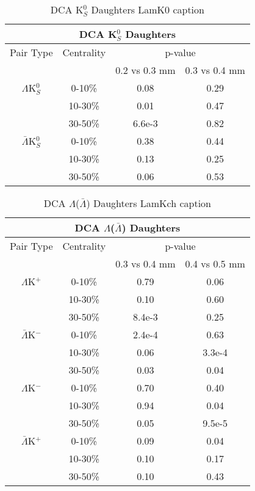 \begin{table}
 \centering
 \begin{tabular}{|c|c|c|c|}
 \multicolumn{4}{c}{DCA K$^{0}_{S}$ Daughters} \\
  \hline
  Pair Type & Centrality & \multicolumn{2}{c|}{p-value} \\
  \cline{3-4}
   & & 0.2 vs 0.3 mm & 0.3 vs 0.4 mm \\
  \hline
  $\Lambda$K$^{0}_{S}$ & 0-10\% & 0.08 & 0.29 \\
   & 10-30\% & 0.01 & 0.47 \\
   & 30-50\% & 6.6e-3 & 0.82 \\
  \hline
  $\bar{\Lambda}$K$^{0}_{S}$ & 0-10\% & 0.38 & 0.44 \\
   & 10-30\% & 0.13 & 0.25 \\
   & 30-50\% & 0.06 & 0.53 \\
  \hline
 \end{tabular}
 \caption{DCA K$^{0}_{S}$ Daughters LamK0 caption}
 \label{tab:K0DaughtersDcaLamK0}
\end{table}

\begin{table}
 \centering
 \begin{tabular}{|c|c|c|c|}
 \multicolumn{4}{c}{DCA $\Lambda$($\bar{\Lambda}$) Daughters} \\
  \hline
  Pair Type & Centrality & \multicolumn{2}{c|}{p-value} \\
  \cline{3-4}
   & & 0.3 vs 0.4 mm & 0.4 vs 0.5 mm \\
  \hline
  $\Lambda$K$^{+}$ & 0-10\% & 0.79 & 0.06 \\
   & 10-30\% & 0.10 & 0.60 \\
   & 30-50\% & 8.4e-3 & 0.25 \\
  \hline
  $\bar{\Lambda}$K$^{-}$ & 0-10\% & 2.4e-4 & 0.63 \\
   & 10-30\% & 0.06 & 3.3e-4 \\
   & 30-50\% & 0.03 & 0.04 \\
  \hline \hline
  $\Lambda$K$^{-}$ & 0-10\% & 0.70 & 0.40 \\
   & 10-30\% & 0.94 & 0.04 \\
   & 30-50\% & 0.05 & 9.5e-5 \\
  \hline
  $\bar{\Lambda}$K$^{+}$ & 0-10\% & 0.09 & 0.04 \\
   & 10-30\% & 0.10 & 0.17 \\
   & 30-50\% & 0.10 & 0.43 \\
  \hline
 \end{tabular}
 \caption{DCA $\Lambda$($\bar{\Lambda}$) Daughters LamKch caption}
 \label{tab:LamDaughtersDcaLamKch}
\end{table}